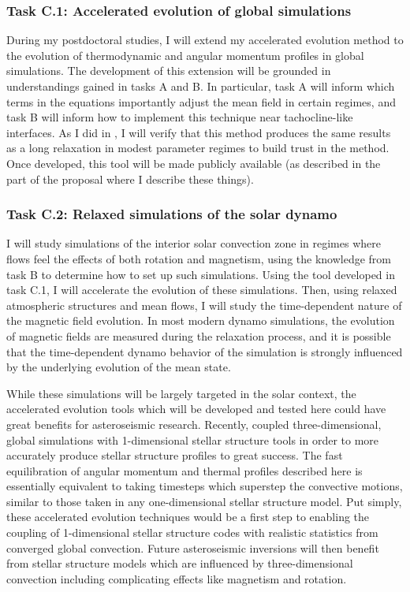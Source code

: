 \documentclass[aasms,11pt]{article}
\begin{document}
\subsubsection{Task C.1: Accelerated evolution of global simulations}
During my postdoctoral studies, I will extend my accelerated evolution method to the evolution of thermodynamic and angular momentum profiles in global simulations.
The development of this extension will be grounded in understandings gained in tasks A and B.
In particular, task A will inform which terms in the equations importantly adjust the mean field in certain regimes, and task B will inform how to implement this technique near tachocline-like interfaces.
As I did in \citet{anders&all2018}, I will verify that this method produces the same results as a long relaxation in modest parameter regimes to build trust in the method.
Once developed, this tool will be made publicly available (as described in the part of the proposal where I describe these things).

\subsubsection{Task C.2: Relaxed simulations of the solar dynamo}
I will study simulations of the interior solar convection zone in regimes where flows feel the effects of both rotation and magnetism, using the knowledge from task B to determine how to set up such simulations.
Using the tool developed in task C.1, I will accelerate the evolution of these simulations.
Then, using relaxed atmospheric structures and mean flows, I will study the time-dependent nature of the magnetic field evolution.
In most modern dynamo simulations, the evolution of magnetic fields are measured during the relaxation process, and it is possible that the time-dependent dynamo behavior of the simulation is strongly influenced by the underlying evolution of the mean state.

While these simulations will be largely targeted in the solar context, the accelerated evolution tools which will be developed and tested here could have great benefits for asteroseismic research.
Recently, \citet{jorgensen&weiss2019} coupled three-dimensional, global simulations with 1-dimensional stellar structure tools in order to more accurately produce stellar structure profiles to great success.
The fast equilibration of angular momentum and thermal profiles described here is essentially equivalent to taking timesteps which superstep the convective motions, similar to those taken in any one-dimensional stellar structure model.
Put simply, these accelerated evolution techniques would be a first step to enabling the coupling of 1-dimensional stellar structure codes with realistic statistics from converged global convection.
Future asteroseismic inversions will then benefit from stellar structure models which are influenced by three-dimensional convection including complicating effects like magnetism and rotation.
\end{document}
